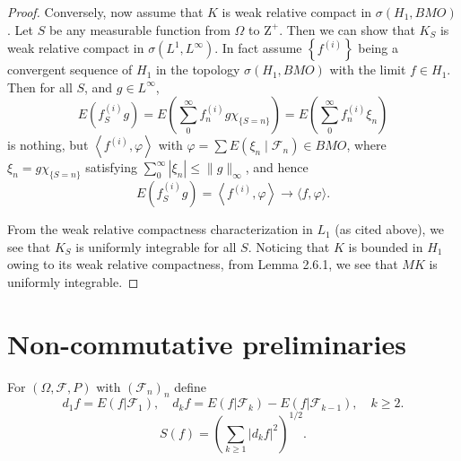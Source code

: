 \documentclass[reqno]{amsart}
\numberwithin{equation}{section}
\begin{document}
\begin{proof}
Conversely, now assume that $K$ is weak relative compact in $\sigma\left(H_1, B M O\right)$. Let $S$ be any measurable function from $\Omega$ to $\mathrm{Z}^{+}$. Then we can show that $K_S$ is weak relative compact in $\sigma\left(L^1, L^{\infty}\right)$. In fact assume $\left\{f^{(i)}\right\}$ being a convergent sequence of $H_1$ in the topology $\sigma\left(H_1, B M O\right)$ with the limit $f \in H_1$. Then for all $S$, and $g \in L^{\infty}$,
$$
E\left(f_S^{(i)} g\right)=E\left(\sum_0^{\infty} f_n^{(i)} g \chi_{\{S=n\}}\right)=E\left(\sum_0^{\infty} f_n^{(i)} \xi_n\right)
$$
is nothing, but $\left\langle f^{(i)}, \varphi\right\rangle$ with $\varphi=\sum E\left(\xi_n \mid \mathcal{F}_n\right) \in B M O$, where $\xi_n=g \chi_{\{S=n\}}$ satisfying $\sum_0^{\infty}\left|\xi_n\right| \leq\|g\|_{\infty}$, and hence
$$
E\left(f_S^{(i)} g\right)=\left\langle f^{(i)}, \varphi\right\rangle \rightarrow\langle f, \varphi\rangle .
$$

From the weak relative compactness characterization in $L_1$ (as cited above), we see that $K_S$ is uniformly integrable for all $S$. Noticing that $K$ is bounded in $H_1$ owing to its weak relative compactness, from Lemma 2.6.1, we see that $M K$ is uniformly integrable.
\end{proof}

\section{Non-commutative preliminaries}
For $(\Omega, \mathcal{F}, P)$ with $(\mathcal{F}_n)_n$ define
$$d_1 f =E(f|\mathcal{F}_1), \quad d_k f=E(f|\mathcal{F}_k)-E(f|\mathcal{F}_{k-1}), \quad k\ge2.$$
$$S(f)=\left(\sum_{k\ge1} |d_kf|^2\right)^{1/2}.$$
\end{document}
